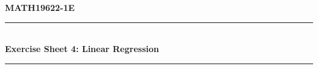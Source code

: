 \documentclass[11pt, a4paper]{article}
\begin{document}
\begin{center}
    \textbf{\large MATH19622-1E} \\
    \vspace{0.2cm}
    \rule{0.8\textwidth}{0.4pt} \\
    \vspace{0.4cm}
    \textbf{\Large Exercise Sheet 4: Linear Regression} \\
    \vspace{0.4cm}
    \rule{0.8\textwidth}{0.4pt} \\
\end{center}
\vspace{0.6cm}


\end{document}
